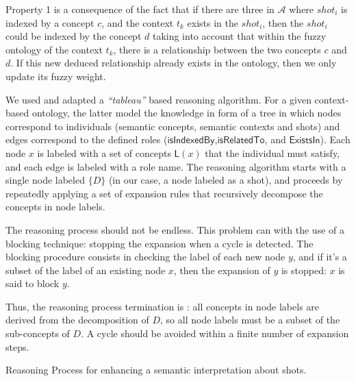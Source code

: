 		Property 1 is a consequence of the fact that if there are three  in $\mathcal{A}$ 
		where $shot_{i}$ is indexed by a concept $c$, and the context $t_{k}$ exists in the $shot_{i}$, 
		then the $shot_{i}$ could be indexed by the concept $d$ taking into account that within the 
		fuzzy ontology of the context $t_{k}$, there is a relationship between the two concepts $c$ and $d$.
		If this new deduced relationship already exists in the ontology, then we only update its fuzzy weight.

		We used and adapted a \emph{“tableau”} based reasoning algorithm.
 		For a given context-based ontology, the latter model the knowledge in form of 
		a tree in which nodes correspond to individuals (semantic concepts, semantic contexts and shots) 
 		and edges correspond to the defined roles ($\mathsf{isIndexedBy}$,$\mathsf{isRelatedTo}$,
 		and $\mathsf{ExistsIn}$).
 		Each node $x$ is labeled with a set of concepts $\mathsf{L}(x)$ that the
 		individual must satisfy, and each edge is labeled with a role name.
 		The reasoning algorithm starts with a single node labeled $\{D\}$ (in our case, a
 		node labeled as a shot), and proceeds by repeatedly applying a set of expansion 
		rules that recursively decompose the concepts in node labels.

		The reasoning process should not be endless. This problem can  with the use 
		of a blocking technique: stopping the expansion when a cycle is detected. The 
		blocking procedure consists in checking the label of each new node $y$, and if 
		it's a subset of the label of an existing node $x$, then the expansion of $y$ 
		is stopped: $x$ is said to block $y$.
		
		Thus, the reasoning process termination is : all concepts in node labels
		are derived from the decomposition of $D$, so all node labels must be a subset  
		of the sub-concepts of $D$. A cycle should be avoided within a finite number of expansion steps.

		\begin{algorithm}
			
			\SetAlgoLined
			\caption{Reasoning Process for enhancing a semantic interpretation about shots.}
			\label{algo112}
		\end{algorithm}
		

